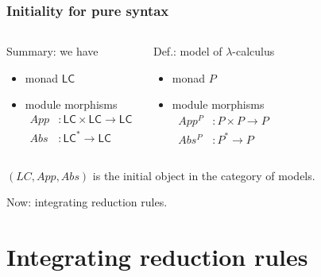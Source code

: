 \documentclass[
serif,
mathsans,
]
{beamer}
\newcommand{\LC}{\mathsf{LC}}
\begin{document}
\begin{frame}
 \frametitle{Initiality for pure syntax}
 \begin{columns}
  \begin{block}{Summary: we have}
    \begin{itemize}
     \item monad $\LC$
     \item module morphisms
     \vspace{-.5em}
               \begin{align*}
                    App &: \LC \times \LC  \to \LC\\
                    Abs &: \LC^* \to \LC
    \end{align*}
             
    \end{itemize}

  \end{block}
  
  \begin{block}{Def.: model of $\lambda$-calculus}
    \begin{itemize}
     \item monad $P$
     \item module morphisms
     \vspace{-.5em}
               \begin{align*}
                    App^P &: P \times P  \to P\\
                    Abs^P &: P^* \to P
    \end{align*}
    \end{itemize}
  \end{block}
  
 \end{columns}
 
 \begin{theorem}
    $(LC, App, Abs)$ is the initial object in the category of models.
 \end{theorem}
 
 Now: integrating reduction rules.
 
\end{frame}




\section{Integrating reduction rules}
\end{document}
